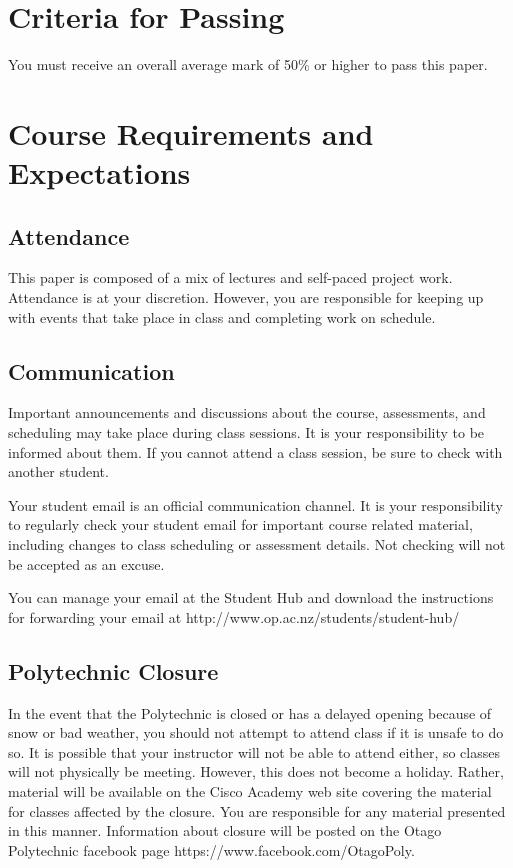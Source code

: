 \documentclass{article}
\begin{document}
\section*{Criteria for Passing}
You must receive an overall average mark of 50\% or higher to pass this paper.

\section*{Course Requirements and Expectations}
\subsection*{Attendance}
This paper is composed of a mix of lectures and self-paced project work.  Attendance is at your discretion. 
However, you are responsible for keeping up with events that take place in class and completing work on schedule. 

\subsection*{Communication}
Important announcements and discussions about the course, assessments, and scheduling may take place during class sessions.  It is your responsibility to be informed about them.  If you cannot attend a class session, be sure to check with another student.


Your student email is an official communication channel. It is your responsibility to regularly check your student email for important course related material, including changes to class scheduling or assessment details. Not checking will not be accepted as an excuse.

You can manage your email at the Student Hub and download the instructions for forwarding your email at http://www.op.ac.nz/students/student-hub/

\subsection*{Polytechnic Closure}
In the event that the Polytechnic is closed or has a delayed opening because of snow or bad weather, you should not attempt to attend class if it is unsafe to do so. It is possible that your instructor will not be able to attend either, so classes will not physically be meeting. However, this does not become a holiday. Rather, material will be available on the Cisco Academy web site covering the material for classes affected by the closure. You are responsible for any material presented in this manner. Information about closure will be posted on the Otago Polytechnic facebook page https://www.facebook.com/OtagoPoly.
\end{document}
